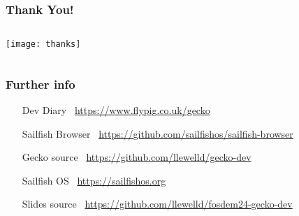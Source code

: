 \documentclass[
	notes=none,
	aspectratio=169
]{beamer}
\begin{document}

\begin{frame}
\frametitle{Thank You!}

\begin{columns}[T]
\begin{column}[T]{1.1\textwidth}

\vspace{-0.5cm}
\texttt{[image: thanks]}

\end{column}
\end{columns}

\end{frame}


\begin{frame}[fragile]
\frametitle{Further info}
\setlength{\leftmargini}{7.0em}
\vspace{0.8cm}

\begin{itemize}
\setlength{\parskip}{1.0em}
\item[Dev Diary] \, \url{https://www.flypig.co.uk/gecko}
\item[Sailfish Browser] \, \url{https://github.com/sailfishos/sailfish-browser}
\item[Gecko source] \, \url{https://github.com/llewelld/gecko-dev}
\item[Sailfish OS] \, \url{https://sailfishos.org}
\item[Slides source] \, \url{https://github.com/llewelld/fosdem24-gecko-dev}
\end{itemize}

\end{frame}
\note{
\fontsize{7pt}{8pt}{}

}

\end{document}
